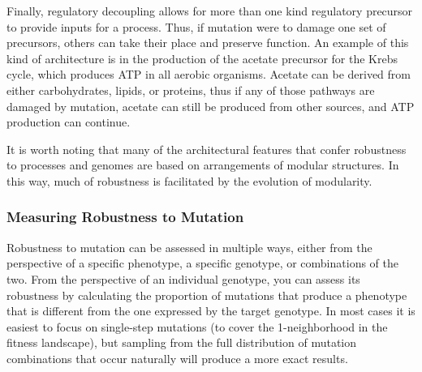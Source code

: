 \documentclass[PhD]{msu-thesis}
\begin{document}
Finally, regulatory decoupling allows for more than one kind regulatory precursor to provide inputs for a process\cite{wagner_distributed_2005}. Thus, if mutation were to damage one set of precursors, others can take their place and preserve function. An example of this kind of architecture is in the production of the acetate precursor for the Krebs cycle, which produces ATP in all aerobic organisms\cite{baldwin_evolution_1981}. Acetate can be derived from either carbohydrates, lipids, or proteins, thus if any of those pathways are damaged by mutation, acetate can still be produced from other sources, and ATP production can continue.

It is worth noting that many of the architectural features that confer robustness to processes and genomes are based on arrangements of modular structures\cite{stelling_robustness_2004,wagner_road_2007}. In this way, much of robustness is facilitated by the evolution of modularity.



\subsubsection{Measuring Robustness to Mutation}
Robustness to mutation can be assessed in multiple ways, either from the perspective of a specific phenotype, a specific genotype, or combinations of the two. From the perspective of an individual genotype, you can assess its robustness by calculating the proportion of mutations that produce a phenotype that is different from the one expressed by the target genotype\cite{andreas_wagner_robustness_2008}. In most cases it is easiest to focus on single-step mutations (to cover the 1-neighborhood in the fitness landscape), but sampling from the full distribution of mutation combinations that occur naturally will produce a more exact results.
\end{document}
